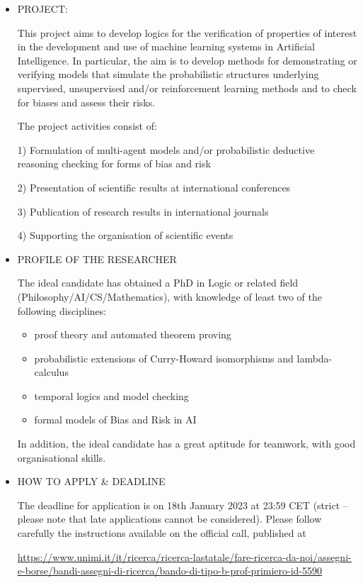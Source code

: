 \documentclass[prodmode,acmtecs]{acmsmall} %
\begin{document}
\begin{itemize}\item  PROJECT:  
 
  This project aims to develop logics for the verification of properties of interest in the development and use of machine learning systems in Artificial Intelligence. In particular, the aim is to develop methods for demonstrating or verifying models that simulate the probabilistic structures underlying supervised, unsupervised and/or reinforcement learning methods and to check for biases and assess their risks. 
 
  The project activities consist of: 
 
  1) Formulation of multi-agent models and/or probabilistic deductive reasoning checking for forms of bias and risk 
 
  2) Presentation of scientific results at international conferences 
 
  3) Publication of research results in international journals 
 
  4) Supporting the organisation of scientific events 
 
\item  PROFILE OF THE RESEARCHER   
 
  The ideal candidate has obtained a PhD in Logic or related field (Philosophy/AI/CS/Mathematics), with knowledge of least two of the following disciplines: 
 
\begin{itemize}\item  proof theory and automated theorem proving
\item  probabilistic extensions of Curry-Howard isomorphisms and lambda-calculus
\item  temporal logics and model checking
\item  formal models of Bias and Risk in AI
\end{itemize} 
  In addition, the ideal candidate has a great aptitude for teamwork, with good organisational skills. 
 
\item  HOW TO APPLY \& DEADLINE  
 
  The deadline for application is on 18th January 2023 at 23:59 CET (strict – please note that late applications cannot be considered). Please follow carefully the instructions available on the official call, published at  
 
  \href{https://www.unimi.it/it/ricerca/ricerca-lastatale/fare-ricerca-da-noi/assegni-e-borse/bandi-assegni-di-ricerca/bando-di-tipo-b-prof-primiero-id-5590}{https://www.unimi.it/it/ricerca/ricerca-lastatale/fare-ricerca-da-noi/assegni-e-borse/bandi-assegni-di-ricerca/bando-di-tipo-b-prof-primiero-id-5590} 
 

\end{itemize}
\end{document}
